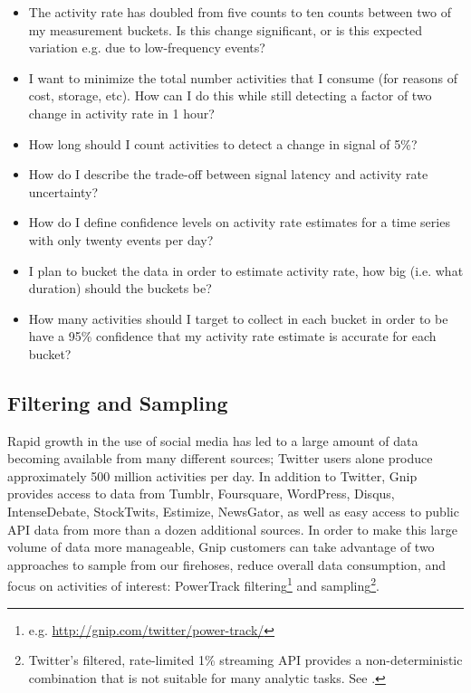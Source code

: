 \documentclass{article}
\begin{document}
\begin{itemize}
	\item The activity rate has doubled from five counts to ten counts between two of my measurement 
buckets. Is this change significant, or is this expected variation e.g. due to low-frequency events?
	\item I want to minimize the total number activities that I consume (for reasons of cost, storage, etc). 
How can I do this while still detecting a factor of two change in activity rate in 1 hour?
	\item How long should I count activities to detect a change in signal of 5\%?
	\item How do I describe the trade-off between signal latency and activity rate uncertainty?
	\item How do I define confidence levels on activity rate estimates for a time series with only twenty 
events per day?
	\item I plan to bucket the data in order to estimate activity rate, how big (i.e. what duration) should 
the buckets be? 
	\item How many activities should I target to collect in each bucket in order to be have a 95\% 
confidence that my activity rate estimate is accurate for each bucket? 
\end{itemize}


\subsection{Filtering and Sampling} 
\label{filter}


Rapid growth in the use of social media has led to a large amount of data becoming available 
from many different sources; Twitter users alone produce approximately 500 million activities per day. 
In addition to Twitter, Gnip provides access to data from Tumblr, Foursquare, WordPress, Disqus, 
IntenseDebate, StockTwits, Estimize, NewsGator, as well as easy access to public API data from more than a dozen 
additional sources. In order to make this large volume of data more manageable, Gnip customers can take 
advantage of two approaches to sample from our firehoses, reduce overall data consumption, and focus 
on activities of interest: PowerTrack filtering\footnote{e.g. \url{http://gnip.com/twitter/power-track/} } 
and sampling\footnote{Twitter's filtered, rate-limited 1\% streaming API provides a non-deterministic 
combination that is not suitable for many analytic tasks.  See \cite{Morstatter:2013}.}. 
\end{document}
